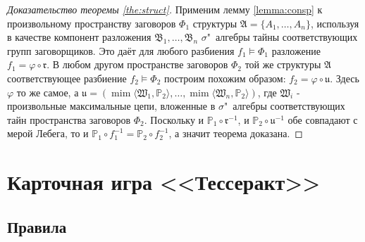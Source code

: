 \begin{proof}[Доказательство теоремы \ref{the:struct}]
	Применим лемму \ref{lemma:consp} к произвольному пространству заговоров $\Phi_1$ структуры $\mathfrak{A} = \{A_1, \ldots, A_n\}$, используя в качестве компонент разложения $\mathfrak{B}_1, \ldots, \mathfrak{B}_n$ $\sigma$"~алгебры тайны соответствующих групп заговорщиков. Это даёт для любого разбиения $f_1 \models \Phi_1$ разложение $f_1 = \varphi \circ \mathfrak{r}$. В любом другом пространстве заговоров $\Phi_2$ той же структуры $\mathfrak{A}$ соответствующее разбиение $f_2 \models \Phi_2$ построим похожим образом: $f_2 = \varphi \circ \mathfrak{u}$. Здесь $\varphi$ то же самое, а $\mathfrak{u} = (\operatorname{mim}\langle\mathfrak{W}_1, \mathbb{P}_2\rangle, \ldots, \operatorname{mim}\langle\mathfrak{W}_n, \mathbb{P}_2\rangle)$, где $\mathfrak{W}_i$ - произвольные максимальные цепи, вложенные в $\sigma$"~алгебры соответствующих тайн пространства заговоров $\Phi_2$. Поскольку и $\mathbb{P}_1 \circ \mathfrak{r}^{-1}$, и $\mathbb{P}_2 \circ \mathfrak{u}^{-1}$ обе совпадают с мерой Лебега, то и $\mathbb{P}_1 \circ f_1^{-1} = \mathbb{P}_2 \circ f_2^{-1}$, а значит теорема доказана.
\end{proof}

\chapter{Карточная игра <<Тессеракт>>}\label{app:D}

\section{Правила}\label{app:D1}

